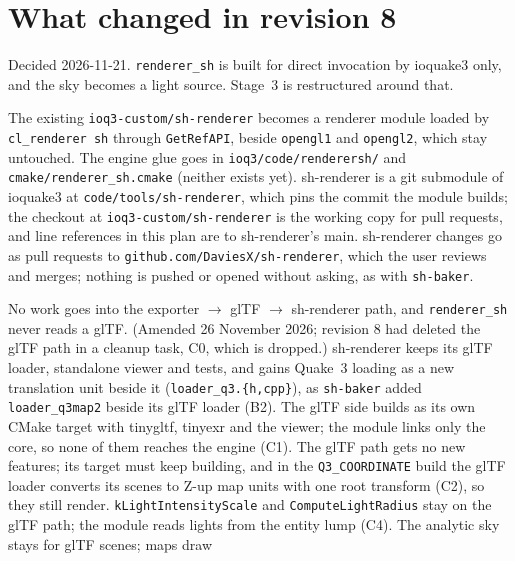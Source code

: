 \documentclass[11pt,a4paper]{article}
\begin{document}
\section{What changed in revision 8}\label{sec:rev8}

Decided 2026-11-21. \texttt{renderer\_sh} is built for direct invocation by ioquake3 only, and the
sky becomes a light source. Stage~3 is restructured around that.

\begin{description}[style=nextline]
\item[\texttt{renderer\_sh} is sh-renderer grown into an ioquake3 module.] The existing
  \texttt{ioq3-custom/sh-renderer} becomes a renderer module loaded by \texttt{cl\_renderer sh}
  through \texttt{GetRefAPI}, beside \texttt{opengl1} and \texttt{opengl2}, which stay untouched.
  The engine glue goes in \texttt{ioq3/code/renderersh/} and \texttt{cmake/renderer\_sh.cmake}
  (neither exists yet). sh-renderer is a git submodule of ioquake3 at
  \texttt{code/tools/sh-renderer}, which pins the commit the module builds; the checkout at
  \texttt{ioq3-custom/sh-renderer} is the working copy for pull requests, and line references in
  this plan are to sh-renderer's main. sh-renderer changes go as pull requests to
  \texttt{github.com/DaviesX/sh-renderer}, which the user reviews and merges; nothing is pushed or
  opened without asking, as with \texttt{sh-baker}.
\item[Direct invocation is the target; the glTF loader stays beside a Q3 loader.] No work goes
  into the exporter $\to$ glTF $\to$ sh-renderer path, and \texttt{renderer\_sh} never reads a glTF.
  (Amended 26 November 2026; revision 8 had deleted the glTF path in a cleanup task, C0, which is
  dropped.) sh-renderer keeps its glTF loader, standalone viewer and tests, and gains Quake~3
  loading as a new translation unit beside it (\texttt{loader\_q3.\{h,cpp\}}), as \texttt{sh-baker}
  added \texttt{loader\_q3map2} beside its glTF loader (B2). The glTF side builds as its own CMake
  target with tinygltf, tinyexr and the viewer; the module links only the core, so none of them
  reaches the engine (C1). The glTF path gets no new features; its target must keep building, and
  in the \texttt{Q3\_COORDINATE} build the glTF loader converts its scenes to Z-up map units with
  one root transform (C2), so they still render.
  \texttt{kLightIntensityScale} and \texttt{ComputeLightRadius} stay on the glTF path; the module
  reads lights from the entity lump (C4). The analytic sky stays for glTF scenes; maps draw

\end{description}
\end{document}
